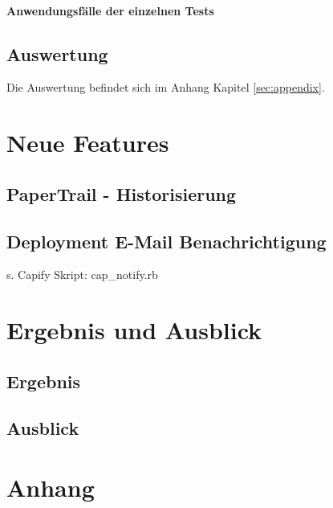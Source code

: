 \documentclass[12pt,             %
               a4paper,          %
               listof=totoc,     %
               index=totoc,      %
               bibliography=totoc,%
               oneside,         %
               BCOR1cm,          %
               english   %
               ]{scrbook}
\begin{document}
\subsubsection{Anwendungsfälle der einzelnen Tests}

\section{Auswertung}
Die Auswertung befindet sich im Anhang Kapitel \vref{sec:appendix}.

\chapter{Neue Features}
\section{PaperTrail - Historisierung}

\clearpage

\section{Deployment E-Mail Benachrichtigung}
s. Capify Skript: \glqq cap\_notify.rb\grqq

\chapter{Ergebnis und Ausblick}
\section{Ergebnis}
\section{Ausblick}

\clearpage
\chapter{Anhang}\label{sec:appendix}


\newpage
\listoffigures

\newpage
\listoftables

\newpage
\lstlistoflistings

\newpage

\end{document}
